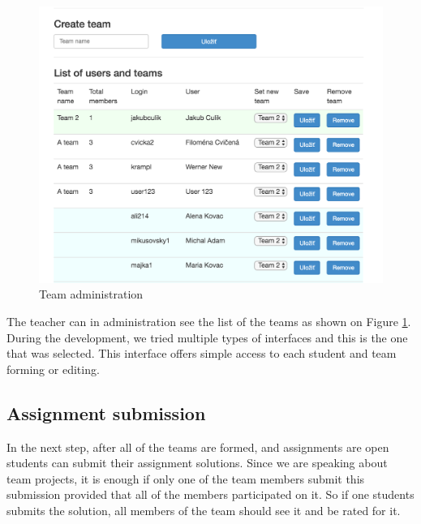 \begin{figure}[h]
    \centering
    \includegraphics[width=\textwidth]{images/teamadmin.png}
    \caption{Team administration}
    \label{team_forming}
\end{figure}

The teacher can in administration see the list of the teams as shown on Figure \ref{team_forming}. During the development, we tried multiple types of interfaces and this is the one that was selected. This interface offers simple access to each student and team forming or editing.



\subsection{Assignment submission}
In the next step, after all of the teams are formed, and assignments are open students can submit their assignment solutions. Since we are speaking about team projects, it is enough if only one of the team members submit this submission provided that all of the members participated on it. So if one students submits the solution, all members of the team should see it and be rated for it.

